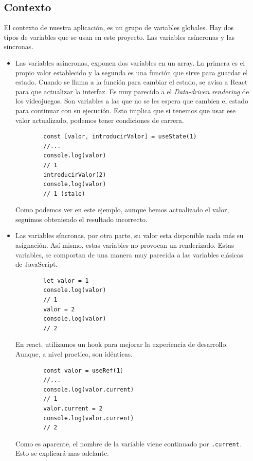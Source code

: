 \subsection{Contexto}
El contexto de nuestra aplicación, es un grupo de variables globales. Hay dos tipos de variables que se usan en este proyecto.
Las variables asíncronas y las síncronas.
\begin{itemize}
    \item Las variables asíncronas, exponen dos variables en un array. La primera es el propio valor establecido y la segunda es una función que sirve para guardar el estado. Cuando se llama a la función para cambiar el estado, se avisa a React para que actualizar la interfaz. Es muy parecido a el \textit{Data-driven rendering} \cite{web:ddr} de los videojuegos. Son variables a las que no se les espera que cambien el estado para continuar con su ejecución. Esto implica que si tenemos que usar ese valor actualizado, podemos tener condiciones de carrera.
    \begin{lstlisting}
        const [valor, introducirValor] = useState(1)
        //...
        console.log(valor)
        // 1
        introducirValor(2)
        console.log(valor)
        // 1 (stale)
    \end{lstlisting}
    Como podemos ver en este ejemplo, aunque hemos actualizado el valor, seguimos obteniendo el resultado incorrecto.
    \item Las variables síncronas, por otra parte, su valor esta disponible nada más su asignación. Así mismo, estas variables no provocan un renderizado. Estas variables, se comportan de una manera muy parecida a las variables clásicas de JavaScript.
    \begin{lstlisting}
        let valor = 1
        console.log(valor)
        // 1
        valor = 2
        console.log(valor)
        // 2
    \end{lstlisting}
    En react, utilizamos un hook para mejorar la experiencia de desarrollo. Aunque, a nivel practico, son idénticas.
    \begin{lstlisting}
        const valor = useRef(1)
        //...
        console.log(valor.current)
        // 1
        valor.current = 2
        console.log(valor.current)
        // 2
    \end{lstlisting}
    Como es aparente, el nombre de la variable viene continuado por \verb|.current|. Esto se explicará mas adelante.
\end{itemize}
